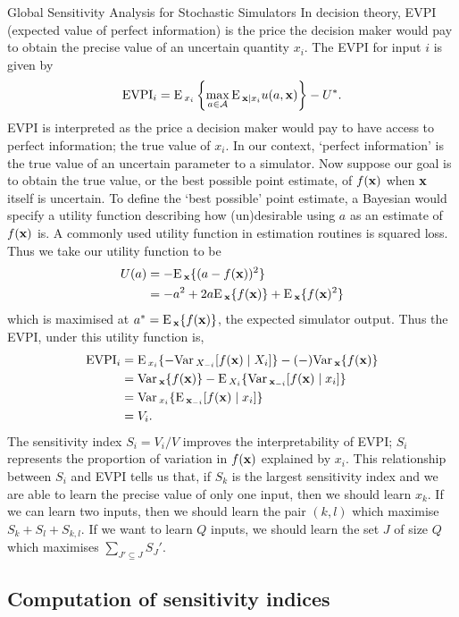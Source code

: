 \begin{chapter}{Global Sensitivity Analysis for Stochastic Simulators\label{Ch:sensitivity}}
In decision theory, EVPI (expected value of perfect information) is the price the decision maker would pay to obtain the precise value of an uncertain quantity $x_i$. The EVPI for input $i$ is given by
\begin{equation}
    \text{EVPI}_i = \textrm{E}\,_{x_i} \left\{  \max_{a \in \mathcal{A}} \textrm{E}\,_{\mathbf{x} \mid x_i} u(a, \mathbf{x})  \right\} - U^*.
\end{equation}
EVPI is interpreted as the price a decision maker would pay to have access to perfect information; the true value of $x_i$. In our context, `perfect information' is the true value of an uncertain parameter to a simulator. Now suppose our goal is to obtain the true value, or the best possible point estimate, of $f(\mathbf{x})$ when $\mathbf{x}$ itself is uncertain. To define the `best possible' point estimate, a Bayesian would specify a utility function describing how (un)desirable using $a$ as an estimate of $f(\mathbf{x})$ is. A commonly used utility function in estimation routines is squared loss. Thus we take our utility function to be
\begin{align}
U(a) &= -\textrm{E}\,_{\mathbf{x}} \{(a - f(\mathbf{x}))^2\}\\
      &= -a^2 + 2a\textrm{E}\,_{\mathbf{x}} \{ f(\mathbf{x}) \} + \textrm{E}\,_{\mathbf{x}} \{ f(\mathbf{x})^2 \}
\end{align}
which is maximised at $a^{*} = \textrm{E}\,_{\mathbf{x}} \{ f(\mathbf{x}) \} $, the expected simulator output. Thus the EVPI, under this utility function is,
\begin{align}
\text{EVPI}_i &= \textrm{E}\,_{x_i} \{ -\mathrm{Var}\,_{X_{-i}}[ f(\mathbf{x}) \mid X_i ]  \} - (-)\mathrm{Var}\,_{\mathbf{x}} \{ f(\mathbf{x}) \} \\
              &= \mathrm{Var}\,_{\mathbf{x}} \{ f(\mathbf{x}) \} -\textrm{E}\,_{X_i} \{ \mathrm{Var}\,_{\mathbf{x}_{-i}}[ f(\mathbf{x}) \mid x_i ] \}\\
              &= \mathrm{Var}\,_{x_i} \{ \textrm{E}\,_{\mathbf{x}_{-i}} [ f(\mathbf{x}) \mid x_i ]  \}\\
              &= V_i.
\end{align}
The sensitivity index $S_i = V_i / V$ improves the interpretability of EVPI; $S_i$ represents the proportion of variation in $f(\mathbf{x})$ explained by $x_i$. This relationship between $S_i$ and EVPI tells us that, if $S_k$ is the largest sensitivity index and we are able to learn the precise value of only one input, then we should learn $x_k$. If we can learn two inputs, then we should learn the pair $(k, l)$ which maximise $S_k + S_l + S_{k,l}$. If we want to learn $Q$ inputs, we should learn the set $J$ of size $Q$ which maximises $\sum_{J' \subseteq J} S_J'$.

\subsection{Computation of sensitivity indices}


\end{chapter}
